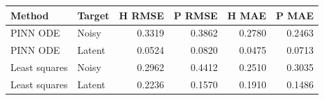 \begin{tabular}{llrrrr}
\toprule
Method & Target & H RMSE & P RMSE & H MAE & P MAE \\
\midrule
PINN ODE & Noisy & 0.3319 & 0.3862 & 0.2780 & 0.2463 \\
PINN ODE & Latent & 0.0524 & 0.0820 & 0.0475 & 0.0713 \\
Least squares & Noisy & 0.2962 & 0.4412 & 0.2510 & 0.3035 \\
Least squares & Latent & 0.2236 & 0.1570 & 0.1910 & 0.1486 \\
\bottomrule\end{tabular}
